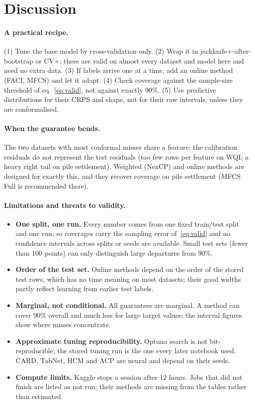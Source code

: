 \documentclass[11pt]{article}
\begin{document}
\section{Discussion}\label{sec:discussion}
\paragraph{A practical recipe.} (1) Tune the base model by cross-validation only. (2) Wrap it in jackknife+-after-bootstrap or CV+; these are valid
on almost every dataset and model here and need no extra data. (3) If labels arrive one at a time, add an online method (FACI, MFCS) and let it adapt.
(4) Check coverage against the sample-size threshold of eq.~\eqref{eq:valid}, not against exactly 90\%. (5) Use predictive distributions for their CRPS
and shape, not for their raw intervals, unless they are conformalised.
\paragraph{When the guarantee bends.} The two datasets with most conformal misses share a feature: the calibration residuals do not represent the test
residuals (too few rows per feature on WQI; a heavy right tail on pile settlement). Weighted (NexCP) and online methods are designed for
exactly this, and they recover coverage on pile settlement (MFCS Full is recommended there).

\paragraph{Limitations and threats to validity.}
\begin{itemize}
\item \textbf{One split, one run.} Every number comes from one fixed train/test split and one run, so coverages carry the sampling
error of~\eqref{eq:valid} and no confidence intervals across splits or seeds are available. Small test sets (fewer than 100 points)
can only distinguish large departures from 90\%.
\item \textbf{Order of the test set.} Online methods depend on the order of the stored test rows, which has no time meaning on most
datasets; their good widths partly reflect learning from earlier test labels.
\item \textbf{Marginal, not conditional.} All guarantees are marginal. A method can cover 90\% overall and much less for large target
values; the interval figures show where misses concentrate.
\item \textbf{Approximate tuning reproducibility.} Optuna search is not bit-reproducible; the stored tuning run is the one every
later notebook used. CARD, TabNet, HCM and ACP are neural and depend on their seeds.
\item \textbf{Compute limits.} Kaggle stops a session after 12 hours. Jobs that did not finish are listed as not run; their methods are
missing from the tables rather than estimated.
\end{itemize}
\end{document}
